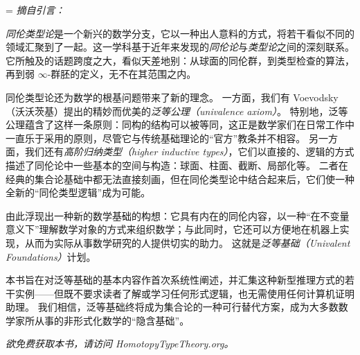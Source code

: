 
{
\parindent=0pt
\parskip=\baselineskip
{\OPTbacktitlefont
\textit{摘自引言：}}
\OPTbackfont

\emph{同伦类型论}是一个新兴的数学分支，它以一种出人意料的方式，将若干看似不同的领域汇聚到了一起。这一学科基于近年来发现的\emph{同伦论}与\emph{类型论}之间的深刻联系。
它所触及的话题跨度之大，看似天差地别：从球面的同伦群，到类型检查的算法，再到弱 $\infty$-群胚的定义，无不在其范围之内。

同伦类型论还为数学的根基问题带来了新的理念。
一方面，我们有 Voevodsky （沃沃茨基）提出的精妙而优美的\emph{泛等公理（univalence axiom）}。
特别地，泛等公理蕴含了这样一条原则：同构的结构可以被等同，这正是数学家们在日常工作中一直乐于采用的原则，尽管它与传统基础理论的``官方''教条并不相容。
另一方面，我们还有\emph{高阶归纳类型（higher inductive types）}，它们以直接的、逻辑的方式描述了同伦论中一些基本的空间与构造：球面、柱面、截断、局部化等。
二者在经典的集合论基础中都无法直接刻画，但在同伦类型论中结合起来后，它们使一种全新的``同伦类型逻辑''成为可能。

由此浮现出一种新的数学基础的构想：它具有内在的同伦内容，以一种``在不变量意义下''理解数学对象的方式来组织数学；与此同时，它还可以方便地在机器上实现，从而为实际从事数学研究的人提供切实的助力。
这就是\emph{泛等基础（Univalent Foundations）}计划。

本书旨在对泛等基础的基本内容作首次系统性阐述，并汇集这种新型推理方式的若干实例——但既不要求读者了解或学习任何形式逻辑，也无需使用任何计算机证明助理。
我们相信，泛等基础终将成为集合论的一种可行替代方案，成为大多数数学家所从事的非形式化数学的``隐含基础''。

\bigskip

\begin{center}
  {\Large
  \textit{欲免费获取本书，请访问 HomotopyTypeTheory.org。}}
\end{center}
}
